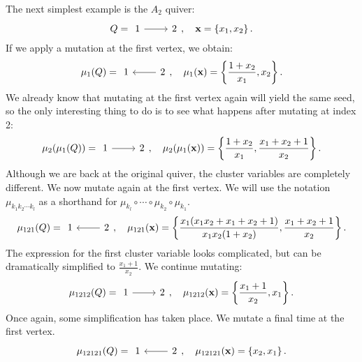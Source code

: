\begin{example}
	The next simplest example is the $A_2$ quiver:
	\begin{equation*}
		Q = \begin{tikzcd}
			1 \rar &2
		\end{tikzcd},
		\quad \bx = \left\{x_1, x_2\right\}.
	\end{equation*}
	If we apply a mutation at the first vertex, we obtain:
	\begin{equation*}
		\mu_1(Q) = \begin{tikzcd}
			1 & \lar 2
		\end{tikzcd},
		\quad \mu_1(\bx) = \left\{\frac{1+x_2}{x_1}, x_2\right\}.
	\end{equation*}
	We already know that mutating at the first vertex again will yield the same seed, so
	the only interesting thing to do is to see what happens after mutating at index 2:
	\begin{equation*}
		\mu_2(\mu_1(Q)) = \begin{tikzcd}
			1 \rar & 2
		\end{tikzcd},
		\quad  \mu_2(\mu_1(\bx)) = \left\{\frac{1+x_2}{x_1}, \frac{x_1 + x_2 + 1}{x_2}\right\}.
	\end{equation*}
	Although we are back at the original quiver, the cluster variables are completely
	different. We now mutate again at the first vertex. We will use the notation
	$\mu_{k_1k_2\cdots k_l}$ as a shorthand for $\mu_{k_l} \circ \cdots \circ \mu_{k_2}
		\circ \mu_{k_1}$.
	\begin{equation*}
		\mu_{121}(Q) = \begin{tikzcd}
			1 &\lar 2
		\end{tikzcd},
		\quad  \mu_{121}(\bx) = \left\{\frac{x_1(x_1 x_2 + x_1 + x_2 + 1)}{x_1x_2(1+x_2)}, \frac{x_1 + x_2 + 1}{x_2}\right\}.
	\end{equation*}
	The expression for the first cluster variable looks complicated, but can be
	dramatically simplified to $\frac{x_1 + 1}{x_2}$. We continue mutating:
	\begin{equation*}
		\mu_{1212}(Q) = \begin{tikzcd}
			1 \rar& 2
		\end{tikzcd},
		\quad  \mu_{1212}(\bx) = \left\{\frac{x_1 + 1}{x_2}, x_1\right\}.
	\end{equation*}
	Once again, some simplification has taken place. We mutate a final time at the first
	vertex.
	\begin{equation*}
		\mu_{12121}(Q) = \begin{tikzcd}
			1 &\lar 2
		\end{tikzcd},
		\quad  \mu_{12121}(\bx) = \left\{x_2, x_1\right\}.
	\end{equation*}


\end{example}
